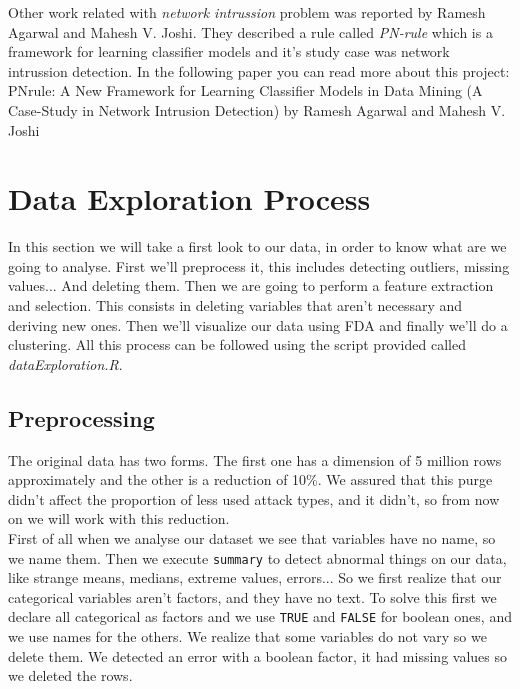 \documentclass[a4paper]{article} %
\begin{document}
Other work related with \textit{network intrussion} problem was reported by Ramesh Agarwal and Mahesh V. Joshi. They described a rule called \textit{PN-rule} which is a framework for learning classifier models and it's study case was network intrussion detection. In the following paper you can read more about this project: PNrule: A New
Framework for Learning
Classifier Models in Data
Mining (A Case-Study in
Network Intrusion
Detection)
by 
Ramesh Agarwal and Mahesh V. Joshi

\section{Data Exploration Process}
In this section we will take a first look to our data, in order to know what are we going to analyse. First we'll preprocess it, this includes detecting outliers, missing values... And deleting them. Then we are going to perform a feature extraction and selection. This consists in deleting variables that aren't necessary and deriving new ones. Then we'll visualize our data using FDA and finally we'll do a clustering. All this process can be followed using the script provided called \textit{dataExploration.R}.\\

\subsection{Preprocessing}
The original data has two forms. The first one has a dimension of 5 million rows approximately and the other is a reduction of 10\%. We assured that this purge didn't affect the proportion of less used attack types, and it didn't, so from now on we will work with this reduction.\\

First of all when we analyse our dataset we see that variables have no name, so we name them. Then we execute \lstinline|summary| to detect abnormal things on our data, like strange means, medians, extreme values, errors... So we first realize that our categorical variables aren't factors, and they have no text. To solve this first we declare all categorical as factors and we use \lstinline|TRUE| and \lstinline|FALSE| for boolean ones, and we use names for the others. We realize that some variables do not vary so we delete them. We detected an error with a boolean factor, it had missing values so we deleted the rows.
\end{document}
